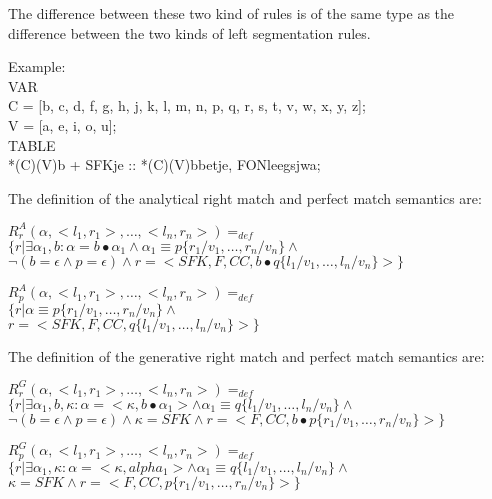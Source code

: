 The difference between these two kind of rules is of the same type as the
difference between the two kinds of left segmentation rules.

\small
\begin{code}
Example: \\
\>VAR\\
\>\>C = [b, c, d, f, g, h, j, k, l, m, n, p, q, r, s, t, v, w, x, y, z];\\
\>\>V = [a, e, i, o, u];\\
\>TABLE\\
\>\>*(C)(V)b + SFKje :: *(C)(V)bbetje, FONleegsjwa;\\
\end{code}
\normalsize

The definition of the analytical right match and perfect match
semantics are:
\small
\begin{code}
$R^{A}_{r}(\alpha,<l_{1},r_{1}>, \ldots ,<l_{n},r_{n}>) =_{def}$\\
\>$\{ r | \exists \alpha_{1}, b : \alpha = b\bullet\alpha_{1} \wedge \alpha_{1} \equiv p\{r_{1}/v_{1},\ldots,r_{n}/v_{n}\} \wedge$\\
\>$\neg( b = \epsilon \wedge p = \epsilon ) \wedge r = <SFK, F, CC, b\bullet q\{l_{1}/v_{1},\ldots,l_{n}/v_{n}\}> \}$\\
\end{code}
\normalsize
\small
\begin{code}
$R^{A}_{p}(\alpha,<l_{1},r_{1}>, \ldots ,<l_{n},r_{n}>) =_{def}$\\
\>$\{ r | \alpha \equiv p\{r_{1}/v_{1},\ldots,r_{n}/v_{n}\} \wedge$\\
\>$r = <SFK, F, CC, q\{l_{1}/v_{1},\ldots,l_{n}/v_{n}\}> \}$\\
\end{code}
\normalsize
The definition of the generative right match and perfect match
semantics are:
\small
\begin{code}
$R^{G}_{r}(\alpha,<l_{1},r_{1}>, \ldots ,<l_{n},r_{n}>) =_{def}$\\
\>$\{ r | \exists \alpha_{1}, b, \kappa : \alpha = <\kappa , b\bullet\alpha_{1}> \wedge \alpha_{1} \equiv q\{l_{1}/v_{1},\ldots,l_{n
}/v_{n}\} \wedge$\\
\>$\neg( b = \epsilon \wedge p = \epsilon ) \wedge \kappa = SFK \wedge r = <F, CC, b\bullet p\{r_{1}/v_{1},\ldots,r_{n}/v_{n}\}> \}$
\\
\end{code}
\normalsize
\small
\begin{code}
$R^{G}_{p}(\alpha,<l_{1},r_{1}>, \ldots ,<l_{n},r_{n}>) =_{def}$\\
\>$\{ r |\exists \alpha_{1}, \kappa : \alpha = <\kappa , alpha_{1}> \wedge \alpha_{1} \equiv q\{l_{1}/v_{1},\ldots,l_{n}/v_{n}\} \wedge$\\
\>$\kappa = SFK \wedge r = <F, CC, p\{r_{1}/v_{1},\ldots,r_{n}/v_{n}\}> \}$\\
\end{code}
\normalsize
